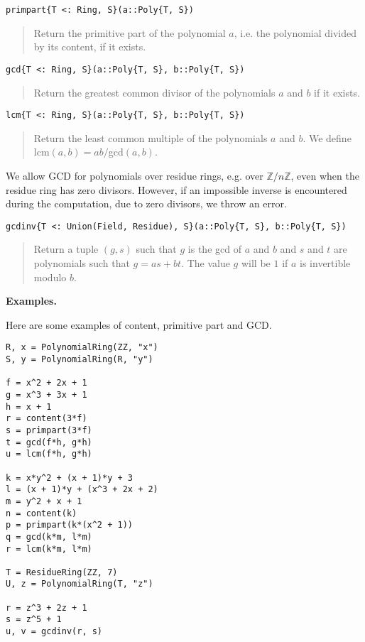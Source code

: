 \documentclass[a4paper,10pt]{article}
\newcommand{\Z}{\mathbb{Z}}
\newcommand{\desc}[1]{\vspace{-3mm}\begin{quote}#1\end{quote}}
\begin{document}
{{{\begin{lstlisting}
primpart{T <: Ring, S}(a::Poly{T, S})
\end{lstlisting}

\desc{Return the primitive part of the polynomial $a$, i.e. the polynomial
divided by its content, if it exists.}

\begin{lstlisting}
gcd{T <: Ring, S}(a::Poly{T, S}, b::Poly{T, S})
\end{lstlisting}

\desc{Return the greatest common divisor of the polynomials $a$ and $b$ if 
it exists.}

\begin{lstlisting}
lcm{T <: Ring, S}(a::Poly{T, S}, b::Poly{T, S})
\end{lstlisting}

\desc{Return the least common multiple of the polynomials $a$ and $b$. We
define lcm$(a, b) = ab/$gcd$(a, b)$.}


We allow GCD for polynomials over residue rings, e.g. over $\Z/n\Z$, even when
the residue ring has zero divisors. However, if an impossible inverse is
encountered during the computation, due to zero divisors, we throw an error.

\begin{lstlisting}
gcdinv{T <: Union(Field, Residue), S}(a::Poly{T, S}, b::Poly{T, S})
\end{lstlisting}

\desc{Return a tuple $(g, s)$ such that $g$ is the gcd of $a$ and $b$ and $s$
and $t$ are polynomials such that $g = as + bt$. The value $g$ will be $1$ if
$a$ is invertible modulo $b$.}

\textbf{Examples.}

Here are some examples of content, primitive part and GCD.

\begin{lstlisting}
R, x = PolynomialRing(ZZ, "x")
S, y = PolynomialRing(R, "y")

f = x^2 + 2x + 1
g = x^3 + 3x + 1
h = x + 1
r = content(3*f)
s = primpart(3*f)
t = gcd(f*h, g*h)
u = lcm(f*h, g*h)

k = x*y^2 + (x + 1)*y + 3
l = (x + 1)*y + (x^3 + 2x + 2)
m = y^2 + x + 1
n = content(k)
p = primpart(k*(x^2 + 1))
q = gcd(k*m, l*m)
r = lcm(k*m, l*m)

T = ResidueRing(ZZ, 7)
U, z = PolynomialRing(T, "z")

r = z^3 + 2z + 1
s = z^5 + 1
u, v = gcdinv(r, s)
\end{lstlisting}

}}}
\end{document}
